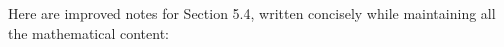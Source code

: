 








Here are improved notes for Section 5.4, written concisely while maintaining all the mathematical content:


